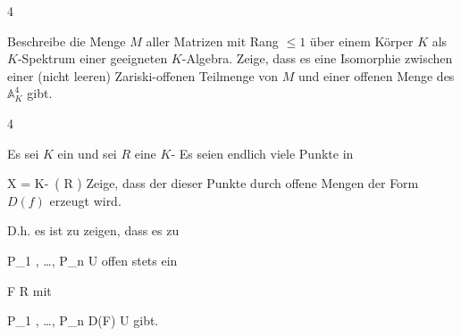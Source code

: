 {4}
{





Beschreibe die Menge $M$ aller
Matrizen mit Rang $\leq 1$ über einem Körper $K$ als $K$-Spektrum einer geeigneten $K$-Algebra. Zeige, dass es eine Isomorphie zwischen einer (nicht leeren) Zariski-offenen Teilmenge von $M$ und einer offenen Menge des ${ {\mathbb A}_{ K }^{  4  } }$ gibt.





}
{} {}

{4}
{





Es sei $K$ ein
und sei $R$ eine
$K$-
Es seien
 endlich viele Punkte in

\mavergleichskette
{\vergleichskette
{ X
}
{ = }{ K\!-\!\, \left(  R  \right)
}
{  }{
}
{    }{
}
{   }{
}
}
{}{}{}
Zeige, dass der
dieser Punkte durch offene Mengen der Form $D(f)$ erzeugt wird.





}
{D.h. es ist zu zeigen, dass es zu

\mavergleichskettek
{\vergleichskettek
{ P_1 , \ldots ,  P_n
}
{ \in }{ U
}
{  }{
}
{    }{
}
{   }{
}
}
{}{}{}
offen stets ein

\mavergleichskette
{\vergleichskette
{ F
}
{ \in }{ R
}
{  }{
}
{    }{
}
{   }{
}
}
{}{}{}
mit

\mavergleichskettek
{\vergleichskettek
{ P_1 , \ldots ,  P_n
}
{ \in }{  D(F)
}
{ \subseteq }{ U
}
{    }{
}
{   }{
}
}
{}{}{}
gibt.} {}

